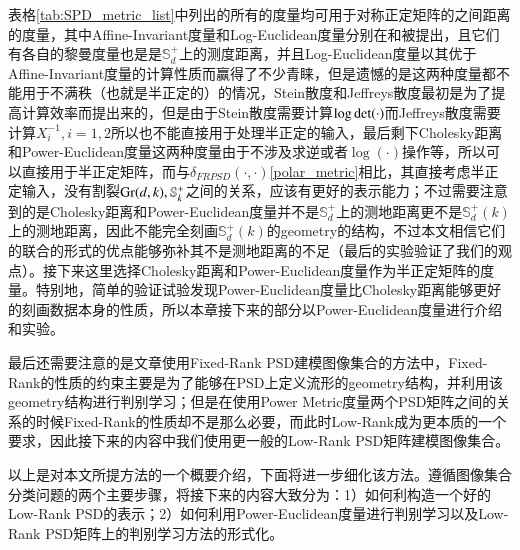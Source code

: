 表格\ref{tab:SPD_metric_list}中列出的所有的度量均可用于对称正定矩阵的之间距离的度量，其中Affine-Invariant度量和Log-Euclidean度量分别在\cite{AIM_metric}和\cite{LEM_metric}被提出，且它们有各自的黎曼度量也是是$\mathbb{S}_{d}^{+}$上的测度距离，并且Log-Euclidean度量以其优于Affine-Invariant度量的计算性质而赢得了不少青睐，但是遗憾的是这两种度量都不能用于不满秩（也就是半正定的）的情况，Stein散度\cite{Stein_divergence}和Jeffreys散度\cite{Jeffreys_divergence}最初是为了提高计算效率而提出来的，但是由于Stein散度需要计算$\log {\rm det}(\cdot)$而Jeffreys散度需要计算$X_{i}^{-1},i=1,2$所以也不能直接用于处理半正定的输入，最后剩下Cholesky距离\cite{Cholesky_distance}和Power-Euclidean度量\cite{Cholesky_distance}这两种度量由于不涉及求逆或者$\log(\cdot)$操作等，所以可以直接用于半正定矩阵，而与$\delta_{FRPSD}(\cdot,\cdot)$\ref{polar_metric}相比，其直接考虑半正定输入，没有割裂${\rm Gr}(d,k),\mathbb{S}_{k}^{+}$之间的关系，应该有更好的表示能力；不过需要注意到的是Cholesky距离和Power-Euclidean度量并不是$\mathbb{S}_{d}^{+}$上的测地距离更不是$\mathbb{S}_{d}^{+}(k)$上的测地距离，因此不能完全刻画$\mathbb{S}_{d}^{+}(k)$的geometry的结构，不过本文相信它们的联合的形式的优点能够弥补其不是测地距离的不足（最后的实验验证了我们的观点）。接下来这里选择Cholesky距离和Power-Euclidean度量作为半正定矩阵的度量。特别地，简单的验证试验发现Power-Euclidean度量比Cholesky距离能够更好的刻画数据本身的性质，所以本章接下来的部分以Power-Euclidean度量进行介绍和实验。

最后还需要注意的是文章\cite{PSD_WACV}使用Fixed-Rank PSD建模图像集合的方法中，Fixed-Rank的性质的约束主要是为了能够在PSD上定义流形的geometry结构，并利用该geometry结构进行判别学习；但是在使用Power Metric度量两个PSD矩阵之间的关系的时候Fixed-Rank的性质却不是那么必要，而此时Low-Rank成为更本质的一个要求，因此接下来的内容中我们使用更一般的Low-Rank PSD矩阵建模图像集合。

以上是对本文所提方法的一个概要介绍，下面将进一步细化该方法。遵循图像集合分类问题的两个主要步骤，将接下来的内容大致分为：1）如何利构造一个好的Low-Rank PSD的表示；2）如何利用Power-Euclidean度量进行判别学习以及Low-Rank PSD矩阵上的判别学习方法的形式化。
